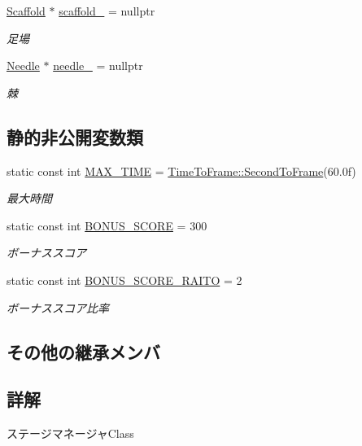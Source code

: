 \begin{DoxyCompactItemize}
\mbox{\hyperlink{class_scaffold}{Scaffold}} $\ast$ \mbox{\hyperlink{class_stage_manager_ab5cf1a29d5a3f8c1e06c2ca64e369d24}{scaffold\+\_\+}} = nullptr
\begin{DoxyCompactList}\small\item\em 足場 \end{DoxyCompactList}\item 
\mbox{\hyperlink{class_needle}{Needle}} $\ast$ \mbox{\hyperlink{class_stage_manager_aaebf5b60351f6406ba9ca9bfaaaf8959}{needle\+\_\+}} = nullptr
\begin{DoxyCompactList}\small\item\em 棘 \end{DoxyCompactList}\end{DoxyCompactItemize}
\subsection*{静的非公開変数類}
\begin{DoxyCompactItemize}
\item 
static const int \mbox{\hyperlink{class_stage_manager_a46709c98366565c68f8de974385501a4}{M\+A\+X\+\_\+\+T\+I\+ME}} = \mbox{\hyperlink{class_time_to_frame_a02fe55cc63bdffd73d092d30cc7f0153}{Time\+To\+Frame\+::\+Second\+To\+Frame}}(60.\+0f)
\begin{DoxyCompactList}\small\item\em 最大時間 \end{DoxyCompactList}\item 
static const int \mbox{\hyperlink{class_stage_manager_aeced4abe9b4df7b0105dd42745506a25}{B\+O\+N\+U\+S\+\_\+\+S\+C\+O\+RE}} = 300
\begin{DoxyCompactList}\small\item\em ボーナススコア \end{DoxyCompactList}\item 
static const int \mbox{\hyperlink{class_stage_manager_aed94634bfdb7bbc3e9cc46724ba87e12}{B\+O\+N\+U\+S\+\_\+\+S\+C\+O\+R\+E\+\_\+\+R\+A\+I\+TO}} = 2
\begin{DoxyCompactList}\small\item\em ボーナススコア比率 \end{DoxyCompactList}\end{DoxyCompactItemize}
\subsection*{その他の継承メンバ}


\subsection{詳解}
ステージマネージャ\+Class 

